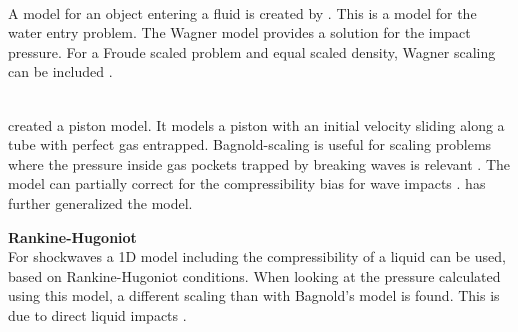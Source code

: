 \textbf{\citet{Wagner1932}}\\
A model for an object entering a fluid is created by \citet{Wagner1932}. This is a model for the water entry problem. The Wagner model provides a solution for the impact pressure. For a Froude scaled problem and equal scaled density, Wagner scaling can be included \cite{Dias2018}. 
\newline \par

\textbf{\citet{Bagnold1939}}\\
\citet{Bagnold1939} created a piston model. It models a piston with an initial velocity sliding along a tube with perfect gas entrapped. Bagnold-scaling is useful for scaling problems where the pressure inside gas pockets trapped by breaking waves is relevant \cite{Brosset2013}. The model can partially correct for the compressibility bias for wave impacts \cite{Lafeber2012}. \citet{Brosset2013} has further generalized the model. 
\newline \par

\textbf{Rankine-Hugoniot}\\
For shockwaves a 1D model including the compressibility of a liquid can be used, based on Rankine-Hugoniot conditions. When looking at the pressure calculated using this model, a different scaling than with Bagnold's model is found. This is due to direct liquid impacts \cite{Dias2018}.
\newline \par

